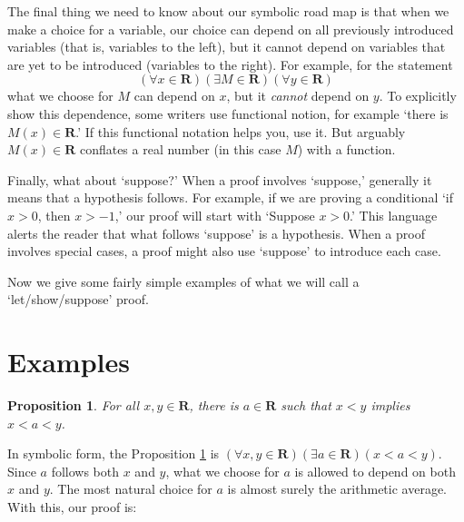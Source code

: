 \documentclass[12pt,fleqn,answers]{article}
\newcommand{\reals}{\mathbf{R}}
\newtheorem{prop}{Proposition}
\begin{document}
The final thing we need to know about our symbolic road map is that when we 
make a choice for a variable, our choice can depend on all previously
introduced variables (that is, variables to the left), but it cannot 
depend on variables that are yet to be introduced (variables to the right). 
For example, 
for the statement
\begin{equation*}
   \left(\forall x \in \reals\right)
   \left(\exists M \in \reals\right)
   \left(\forall y \in \reals \right)
 \end{equation*}
 what we choose for $M$ can depend on $x$, but it \emph{cannot}  depend on $y$. To explicitly show this dependence, some writers
 use functional notion, for example `there is $M(x) \in \reals$.'  If this functional notation helps you, use it. But arguably  
 $M(x) \in \reals$ conflates a real number (in this case $M$) with a function.

Finally, what about `suppose?' When a proof involves `suppose,' generally it means that a hypothesis follows. For example, if
we are proving a conditional `if $x > 0$, then $x > -1$,' our proof will start with `Suppose $x > 0$.' This language alerts the
reader that what follows `suppose' is a hypothesis.  When a proof involves special cases, a proof might also use `suppose' to 
introduce each case.

Now we give some fairly simple examples of what we will call a `let/show/suppose' proof.

\section{Examples}

\begin{prop}
  For all $x,y \in \reals$, there is $a \in \reals$ such that
    $x < y$ implies $x<a<y$. \label{p1}   
\end{prop}
\noindent In symbolic form, the Proposition \ref{p1} is
$\left(\forall x,y \in \reals \right) 
\left(\exists a \in \reals \right)
\left(x < a < y \right)$.  Since $a$ follows both $x$ and $y$, what we choose for $a$ is allowed to depend on both $x$ and $y$. The 
most natural choice for $a$ is almost surely the arithmetic average.  With this, our proof is:
\end{document}
